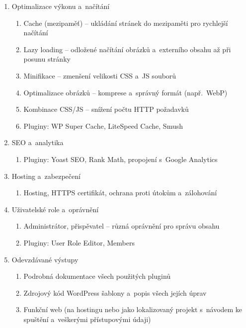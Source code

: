 \documentclass[12pt,a4paper]{article}
\begin{document}
\begin{enumerate}
    \item Optimalizace výkonu a~načítání
    \begin{enumerate}[label=\alph*)]
        \item Cache (mezipaměť) -- ukládání stránek do mezipaměti pro rychlejší načítání
        \item Lazy loading -- odložené načítání obrázků a~externího obsahu až při posunu stránky
        \item Minifikace -- zmenšení velikosti CSS a~JS souborů
        \item Optimalizace obrázků -- komprese a~správný formát (např.\ WebP)
        \item Kombinace CSS/JS -- snížení počtu HTTP požadavků
        \item Pluginy: WP Super Cache, LiteSpeed Cache, Smush
    \end{enumerate}

    \item SEO a~analytika
    \begin{enumerate}[label=\alph*)]
        \item Pluginy: Yoast SEO, Rank Math, propojení s~Google Analytics
    \end{enumerate}

    \item Hosting a~zabezpečení
    \begin{enumerate}[label=\alph*)]
        \item Hosting, HTTPS certifikát, ochrana proti útokům a~zálohování
    \end{enumerate}

    \item Uživatelské role a~oprávnění
    \begin{enumerate}[label=\alph*)]
        \item Administrátor, přispěvatel -- různá oprávnění pro správu obsahu
        \item Pluginy: User Role Editor, Members
    \end{enumerate}

    \item Odevzdávané výstupy
    \begin{enumerate}[label=\alph*)]
        \item Podrobná dokumentace všech použitých pluginů
        \item Zdrojový kód WordPress šablony a~popis všech jejích úprav
        \item Funkční web (na hostingu nebo jako lokalizovaný projekt s~návodem ke spuštění a~veškerými přístupovými údaji)
    \end{enumerate}
\end{enumerate}
\end{document}
